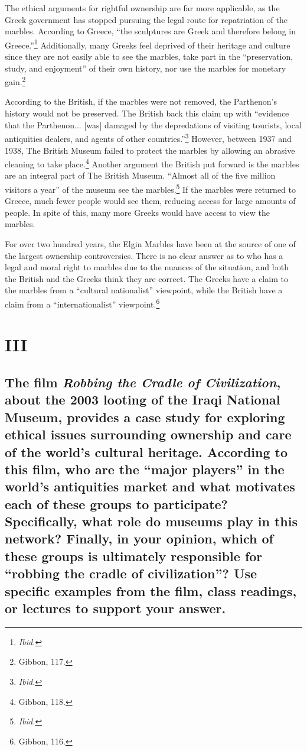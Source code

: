 \documentclass[11pt]{article}
\begin{document}
The ethical arguments for rightful ownership are far more applicable, as the Greek government has stopped pursuing the legal route for repatriation of the marbles. According to Greece, ``the sculptures are Greek and therefore belong in Greece.''\footnote{\textit{Ibid.}} Additionally, many Greeks feel deprived of their heritage and culture since they are not easily able to see the marbles, take part in the ``preservation, study, and enjoyment'' of their own history, nor use the marbles for monetary gain.\footnote{Gibbon, 117.} 

According to the British, if the marbles were not removed, the Parthenon's history would not be preserved. The British back this claim up with ``evidence that the Parthenon... [was] damaged by the depredations of visiting tourists, local antiquities dealers, and agents of other countries.''\footnote{\textit{Ibid.}} However, between 1937 and 1938, The British Museum failed to protect the marbles by allowing an abrasive cleaning to take place.\footnote{Gibbon, 118.} Another argument the British put forward is the marbles are an integral part of The British Museum. ``Almost all of the five million visitors a year'' of the museum see the marbles.\footnote{\textit{Ibid.}} If the marbles were returned to Greece, much fewer people would see them, reducing access for large amounts of people. In spite of this, many more Greeks would have access to view the marbles.

For over two hundred years, the Elgin Marbles have been at the source of one of the largest ownership controversies. There is no clear answer as to who has a legal and moral right to marbles due to the nuances of the situation, and both the British and the Greeks think they are correct. The Greeks have a claim to the marbles from a ``cultural nationalist'' viewpoint, while the British have a claim from a ``internationalist'' viewpoint.\footnote{Gibbon, 116.}

\section*{III}
\singlespacing
\subsection*{The film \textit{Robbing the Cradle of Civilization}, about the 2003 looting of the Iraqi National Museum, provides a case study for exploring ethical issues surrounding ownership and care of the world’s cultural heritage. According to this film, who are the ``major players'' in the world’s antiquities market and what motivates each of these groups to participate? Specifically, what role do museums play in this network? Finally, in your opinion, which of these groups is ultimately responsible for ``robbing the cradle of civilization''? Use specific examples from the film, class readings, or lectures to support your answer.}
\end{document}

